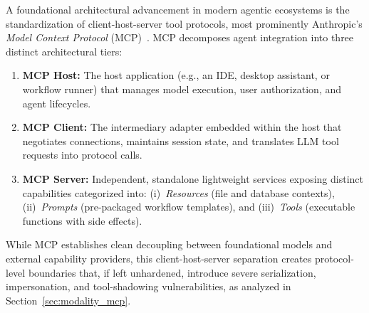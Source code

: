 A foundational architectural advancement in modern agentic ecosystems is the standardization of client-host-server tool protocols, most prominently Anthropic's \textit{Model Context Protocol} (MCP)~\cite{hou2026mcp}. MCP decomposes agent integration into three distinct architectural tiers:
\begin{enumerate}
    \item \textbf{MCP Host:} The host application (e.g., an IDE, desktop assistant, or workflow runner) that manages model execution, user authorization, and agent lifecycles.
    \item \textbf{MCP Client:} The intermediary adapter embedded within the host that negotiates connections, maintains session state, and translates LLM tool requests into protocol calls.
    \item \textbf{MCP Server:} Independent, standalone lightweight services exposing distinct capabilities categorized into: (i)~\textit{Resources} (file and database contexts), (ii)~\textit{Prompts} (pre-packaged workflow templates), and (iii)~\textit{Tools} (executable functions with side effects).
\end{enumerate}
While MCP establishes clean decoupling between foundational models and external capability providers, this client-host-server separation creates protocol-level boundaries that, if left unhardened, introduce severe serialization, impersonation, and tool-shadowing vulnerabilities, as analyzed in Section~\ref{sec:modality_mcp}.
